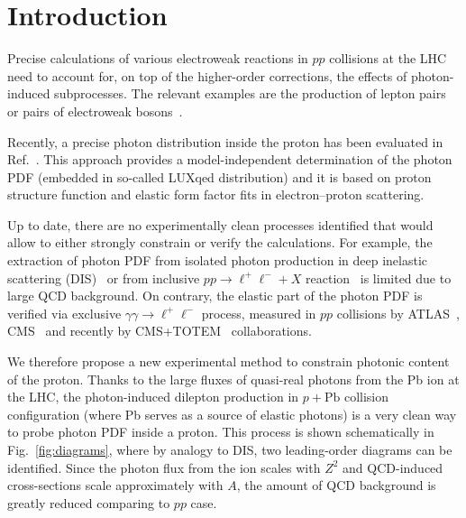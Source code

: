 \section{Introduction}

Precise calculations of various electroweak reactions in $pp$ collisions at the LHC need to account for, on top of the higher-order corrections, the effects of photon-induced subprocesses.
The relevant examples are the production of lepton pairs~\cite{Aad:2014qja, Aad:2016zzw,Accomando:2016tah, Luszczak:2015aoa, Harland-Lang:2016apc} or pairs of electroweak bosons~\cite{Luszczak:2014mta, Denner:2015fca, Dyndal:2015hrp, Ababekri:2016kkj, Biedermann:2016guo, Biedermann:2016yvs, Yong:2016njr, Luszczak:2018ntp}.


Recently, a precise photon distribution inside the proton has been evaluated in Ref.~\cite{Manohar:2016nzj}.
This approach provides a model-independent determination of the photon PDF (embedded in so-called LUXqed distribution)
and  it is based on proton structure function and elastic form factor fits in electron--proton scattering.

Up to date, there are no experimentally clean processes identified that would allow to either strongly constrain or verify the calculations.
For example, the extraction of photon PDF from isolated photon production in deep inelastic scattering (DIS)~\cite{Schmidt:2015zda} 
or from inclusive $pp\rightarrow\ell^+\ell^-+X$ reaction~\cite{Ball:2013hta, Aad:2016zzw, Giuli:2017oii} is limited due to large QCD background.
On contrary, the elastic part of the photon PDF is verified via exclusive $\gamma\gamma\rightarrow\ell^+\ell^-$ process, measured in $pp$ collisions by ATLAS~\cite{Aad:2015bwa,Aaboud:2017oiq}, CMS~\cite{Chatrchyan:2011ci,Chatrchyan:2012tv} and recently by CMS+TOTEM~\cite{Cms:2018het} collaborations.




We therefore propose a new experimental method to constrain photonic content of the proton.
Thanks to the large fluxes of quasi-real photons from the Pb ion at the LHC, the photon-induced dilepton production in $p+\textrm{Pb}$ collision configuration (where Pb serves as a source of elastic photons) is a very clean way to probe photon PDF inside a proton. 
This process is shown schematically in Fig.~\ref{fig:diagrams}, where by analogy to DIS, two leading-order diagrams can be identified.
Since the photon flux from the ion scales with $Z^2$ and QCD-induced cross-sections scale approximately with $A$,
the amount of QCD background is greatly reduced comparing to $pp$ case.

